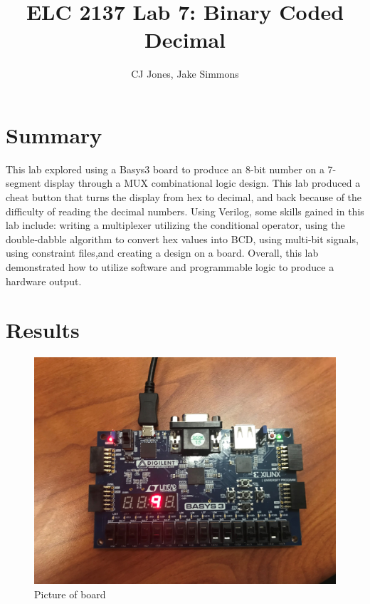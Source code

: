 \documentclass[11pt]{article}
\begin{document}
\title{ELC 2137 Lab 7: Binary Coded Decimal}
\author{CJ Jones, Jake Simmons}

\maketitle


\section*{Summary}

This lab explored using a Basys3 board to produce an 8-bit number on a 7-segment display through a MUX combinational logic design. This lab produced a cheat button that turns the display from hex to decimal, and back because of the difficulty of reading the decimal numbers. Using Verilog, some skills gained in this lab include: writing a multiplexer utilizing the conditional operator, using the double-dabble algorithm to convert hex values into BCD, using multi-bit signals, using constraint files,and creating a design on a board. Overall, this lab demonstrated how to utilize software and programmable logic to produce a hardware output.








\section*{Results}


\begin{figure}[ht]\centering
	\includegraphics[width=1.0\textwidth]{9}
	\caption{Picture of board}
	\label{fig:sim_with_table}
\end{figure}
\end{document}
